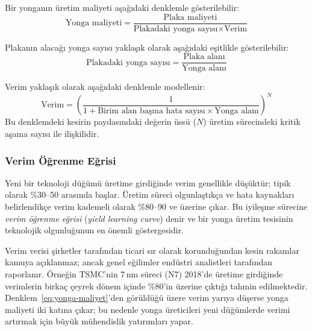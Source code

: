 Bir yonganın üretim maliyeti aşağıdaki denklemle gösterilebilir:
\begin{equation}
\text{Yonga maliyeti} = \frac{\text{Plaka maliyeti}}{\text{Plakadaki yonga sayısı} \times \text{Verim}}
\label{eq:yonga-maliyet}
\end{equation}

Plakanın alacağı yonga sayısı yaklaşık olarak aşağıdaki eşitlikle gösterilebilir:
\begin{equation}
\text{Plakadaki yonga sayısı} = \frac{\text{Plaka alanı}}{\text{Yonga alanı}}
\label{eq:yonga-sayisi}
\end{equation}

Verim yaklaşık olarak aşağıdaki denklemle modellenir:
\begin{equation}
\text{Verim} = \left( \frac{1}{1 + \text{Birim alan başına hata sayısı} \times \text{Yonga alanı}} \right)^{N}
\label{eq:verim}
\end{equation}
Bu denklemdeki kesirin paydasındaki değerin üssü ($N$) üretim sürecindeki kritik aşama sayısı ile ilişkilidir.

\subsubsection*{Verim Öğrenme Eğrisi}

Yeni bir teknoloji düğümü üretime girdiğinde verim genellikle düşüktür; tipik olarak \%30--50 arasında başlar. Üretim süreci olgunlaştıkça ve hata kaynakları belirlendikçe verim kademeli olarak \%80--90 ve üzerine çıkar. Bu iyileşme sürecine \emph{verim öğrenme eğrisi} (\emph{yield learning curve}) denir ve bir yonga üretim tesisinin teknolojik olgunluğunun en önemli göstergesidir.

Verim verisi şirketler tarafından ticari sır olarak korunduğundan kesin rakamlar kamuya açıklanmaz; ancak genel eğilimler endüstri analistleri tarafından raporlanır. Örneğin TSMC'nin 7\,nm süreci (N7) 2018'de üretime girdiğinde verimlerin birkaç çeyrek dönem içinde \%80'in üzerine çıktığı tahmin edilmektedir. Denklem~\ref{eq:yonga-maliyet}'den görüldüğü üzere verim yarıya düşerse yonga maliyeti iki katına çıkar; bu nedenle yonga üreticileri yeni düğümlerde verimi artırmak için büyük mühendislik yatırımları yapar.

